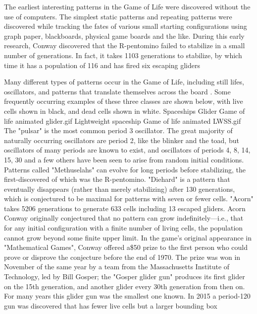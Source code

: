 
The earliest interesting patterns in the Game of Life were discovered without the use of computers. The simplest static patterns and repeating patterns  were discovered while tracking the fates of various small starting configurations using graph paper, blackboards, physical game boards  and the like. During this early research, Conway discovered that the R-pentomino failed to stabilize in a small number of generations. In fact, it takes 1103 generations to stabilize, by which time it has a population of 116 and has fired six escaping gliders

Many different types of patterns occur in the Game of Life, including still lifes, oscillators, and patterns that translate themselves across the board . Some frequently occurring examples of these three classes are shown below, with live cells shown in black, and dead cells shown in white.
Spaceships
Glider	Game of life animated glider.gif
Lightweight spaceship 	Game of life animated LWSS.gif
The "pulsar" is the most common period 3 oscillator. The great majority of naturally occurring oscillators are period 2, like the blinker and the toad, but oscillators of many periods are known to exist, and oscillators of periods 4, 8, 14, 15, 30 and a few others have been seen to arise from random initial conditions. Patterns called "Methuselahs" can evolve for long periods before stabilizing, the first-discovered of which was the R-pentomino. "Diehard" is a pattern that eventually disappears (rather than merely stabilizing) after 130 generations, which is conjectured to be maximal for patterns with seven or fewer cells. "Acorn" takes 5206 generations to generate 633 cells including 13 escaped gliders.
Acorn
Conway originally conjectured that no pattern can grow indefinitely—i.e., that for any initial configuration with a finite number of living cells, the population cannot grow beyond some finite upper limit. In the game's original appearance in "Mathematical Games", Conway offered a\$50 prize to the first person who could prove or disprove the conjecture before the end of 1970. The prize was won in November of the same year by a team from the Massachusetts Institute of Technology, led by Bill Gosper; the "Gosper glider gun" produces its first glider on the 15th generation, and another glider every 30th generation from then on. For many years this glider gun was the smallest one known. In 2015 a period-120 gun was discovered that has fewer live cells but a larger bounding box


